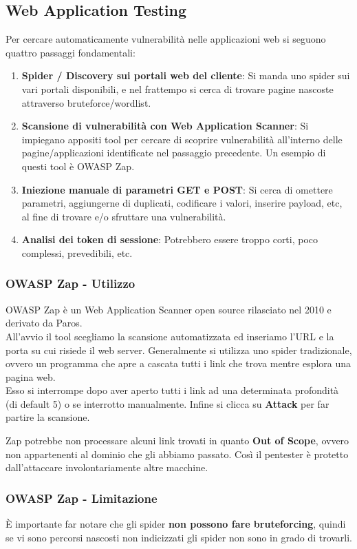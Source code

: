 \documentclass{article}
\begin{document}
\subsection{Web Application Testing}
Per cercare automaticamente vulnerabilità nelle applicazioni web si seguono quattro passaggi fondamentali:
\begin{enumerate}
    \item \textbf{Spider / Discovery sui portali web del cliente}: Si manda uno spider sui vari portali disponibili, e nel frattempo si cerca di trovare pagine nascoste attraverso bruteforce/wordlist.
    \item \textbf{Scansione di vulnerabilità con Web Application Scanner}: Si impiegano appositi tool per cercare di scoprire vulnerabilità all’interno delle pagine/applicazioni identificate nel passaggio precedente. Un esempio di questi tool è OWASP Zap. 
    \item \textbf{Iniezione manuale di parametri GET e POST}: Si cerca di omettere parametri, aggiungerne di duplicati, codificare i valori, inserire payload, etc, al fine di trovare e/o sfruttare una vulnerabilità.
    \item \textbf{Analisi dei token di sessione}: Potrebbero essere troppo corti, poco complessi, prevedibili, etc.
\end{enumerate}

\subsubsection{OWASP Zap - Utilizzo}
OWASP Zap è un Web Application Scanner open source rilasciato nel 2010 e derivato da Paros.\\
All'avvio il tool scegliamo la scansione automatizzata ed inseriamo l'URL e la porta su cui risiede il web server. Generalmente si utilizza uno spider tradizionale, ovvero un programma che apre a cascata tutti i link che trova mentre esplora una pagina web.\\
Esso si interrompe dopo aver aperto tutti i link ad una determinata profondità (di default 5) o se interrotto manualmente. 
Infine si clicca su \textbf{Attack} per far partire la scansione.

Zap potrebbe non processare alcuni link trovati in quanto \textbf{Out of Scope}, ovvero non appartenenti al dominio che gli abbiamo passato. Così il pentester è protetto dall'attaccare involontariamente altre macchine.

\subsubsection{OWASP Zap - Limitazione}
È importante far notare che gli spider \textbf{non possono fare bruteforcing}, quindi se vi sono percorsi nascosti non indicizzati gli spider non sono in grado di trovarli.
\end{document}
